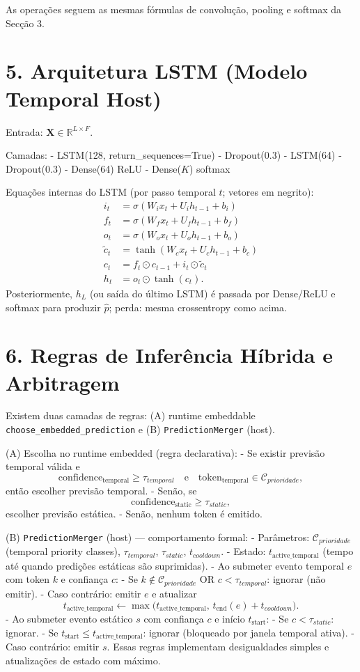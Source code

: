 \documentclass[12pt]{article}
\begin{document}
As operações seguem as mesmas fórmulas de convolução, pooling e softmax da Secção 3.

\section*{5. Arquitetura LSTM (Modelo Temporal Host)}
Entrada: $\mathbf{X}\in\mathbb{R}^{L\times F}$.

Camadas:
- LSTM(128, return\_sequences=True)
- Dropout(0.3)
- LSTM(64)
- Dropout(0.3)
- Dense(64) ReLU
- Dense($K$) softmax

Equações internas do LSTM (por passo temporal $t$; vetores em negrito):
\[
\begin{aligned}
i_t &= \sigma(W_i x_t + U_i h_{t-1} + b_i)\\
f_t &= \sigma(W_f x_t + U_f h_{t-1} + b_f)\\
o_t &= \sigma(W_o x_t + U_o h_{t-1} + b_o)\\
\tilde c_t &= \tanh(W_c x_t + U_c h_{t-1} + b_c)\\
c_t &= f_t \odot c_{t-1} + i_t \odot \tilde c_t\\
h_t &= o_t \odot \tanh(c_t).
\end{aligned}
\]
Posteriormente, $h_{L}$ (ou saída do último LSTM) é passada por Dense/ReLU e softmax para produzir $\hat p$; perda: mesma crossentropy como acima.

\section*{6. Regras de Inferência Híbrida e Arbitragem}

Existem duas camadas de regras: (A) runtime embeddable \texttt{choose\_embedded\_prediction} e (B) \texttt{PredictionMerger} (host).

(A) Escolha no runtime embedded (regra declarativa):
- Se existir previsão temporal válida e
  \[
  \text{confidence}_{\text{temporal}} \ge \tau_{temporal}
  \quad\text{e}\quad
  \text{token}_{\text{temporal}}\in\mathcal{C}_{prioridade},
  \]
  então escolher previsão temporal.
- Senão, se
  \[
  \text{confidence}_{\text{static}} \ge \tau_{static},
  \]
  escolher previsão estática.
- Senão, nenhum token é emitido.

(B) \texttt{PredictionMerger} (host) — comportamento formal:
- Parâmetros: $\mathcal{C}_{prioridade}$ (temporal priority classes), $\tau_{temporal}$, $\tau_{static}$, $t_{cooldown}$.
- Estado: $t_{\text{active\_temporal}}$ (tempo até quando predições estáticas são suprimidas).
- Ao submeter evento temporal $e$ com token $k$ e confiança $c$:
  - Se $k\notin\mathcal{C}_{prioridade}$ OR $c<\tau_{temporal}$: ignorar (não emitir).
  - Caso contrário: emitir $e$ e atualizar
    \[
    t_{\text{active\_temporal}} \leftarrow \max\big(t_{\text{active\_temporal}},\, t_{\text{end}}(e)+t_{cooldown}\big).
    \]
- Ao submeter evento estático $s$ com confiança $c$ e início $t_{\text{start}}$:
  - Se $c<\tau_{static}$: ignorar.
  - Se $t_{\text{start}}\le t_{\text{active\_temporal}}$: ignorar (bloqueado por janela temporal ativa).
  - Caso contrário: emitir $s$.
Essas regras implementam desigualdades simples e atualizações de estado com máximo.
\end{document}
